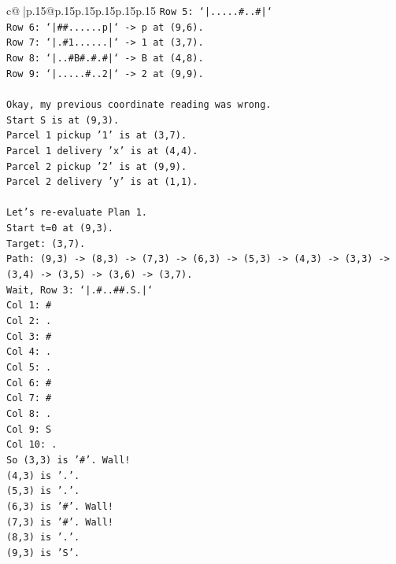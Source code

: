 \documentclass{article}
\begin{document}
{\begin{supertabular}{c@{$\;$}|p{.15\linewidth}@{}p{.15\linewidth}p{.15\linewidth}p{.15\linewidth}p{.15\linewidth}p{.15\linewidth}}
{{{\texttt{Row 5: `|.....\#..\#|`} \\
\texttt{Row 6: `|\#\#......p|` {-}> p at (9,6).} \\
\texttt{Row 7: `|.\#1......|` {-}> 1 at (3,7).} \\
\texttt{Row 8: `|..\#B\#.\#.\#|` {-}> B at (4,8).} \\
\texttt{Row 9: `|.....\#..2|` {-}> 2 at (9,9).} \\
\\ 
\texttt{Okay, my previous coordinate reading was wrong.} \\
\texttt{Start S is at (9,3).} \\
\texttt{Parcel 1 pickup '1' is at (3,7).} \\
\texttt{Parcel 1 delivery 'x' is at (4,4).} \\
\texttt{Parcel 2 pickup '2' is at (9,9).} \\
\texttt{Parcel 2 delivery 'y' is at (1,1).} \\
\\ 
\texttt{Let's re{-}evaluate Plan 1.} \\
\texttt{Start t=0 at (9,3).} \\
\texttt{Target: (3,7).} \\
\texttt{Path: (9,3) {-}> (8,3) {-}> (7,3) {-}> (6,3) {-}> (5,3) {-}> (4,3) {-}> (3,3) {-}> (3,4) {-}> (3,5) {-}> (3,6) {-}> (3,7).} \\
\texttt{Wait, Row 3: `|.\#..\#\#.S.|`} \\
\texttt{Col 1: \#} \\
\texttt{Col 2: .} \\
\texttt{Col 3: \#} \\
\texttt{Col 4: .} \\
\texttt{Col 5: .} \\
\texttt{Col 6: \#} \\
\texttt{Col 7: \#} \\
\texttt{Col 8: .} \\
\texttt{Col 9: S} \\
\texttt{Col 10: .} \\
\texttt{So (3,3) is '\#'. Wall!} \\
\texttt{(4,3) is '.'.} \\
\texttt{(5,3) is '.'.} \\
\texttt{(6,3) is '\#'. Wall!} \\
\texttt{(7,3) is '\#'. Wall!} \\
\texttt{(8,3) is '.'.} \\
\texttt{(9,3) is 'S'.} \\
}}}
\end{supertabular}}
\end{document}
